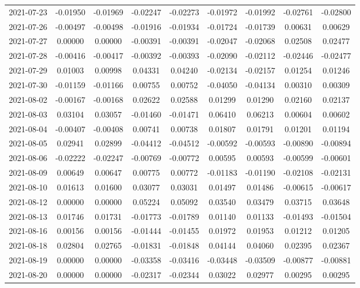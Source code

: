 \begin{footnotesize}
\begin{longtable}{lcccccccc}
2021-07-23 & -0.01950 & -0.01969 & -0.02247 & -0.02273 & -0.01972 & -0.01992 & -0.02761 & -0.02800 \\
2021-07-26 & -0.00497 & -0.00498 & -0.01916 & -0.01934 & -0.01724 & -0.01739 & 0.00631 & 0.00629 \\
2021-07-27 & 0.00000 & 0.00000 & -0.00391 & -0.00391 & -0.02047 & -0.02068 & 0.02508 & 0.02477 \\
2021-07-28 & -0.00416 & -0.00417 & -0.00392 & -0.00393 & -0.02090 & -0.02112 & -0.02446 & -0.02477 \\
2021-07-29 & 0.01003 & 0.00998 & 0.04331 & 0.04240 & -0.02134 & -0.02157 & 0.01254 & 0.01246 \\
2021-07-30 & -0.01159 & -0.01166 & 0.00755 & 0.00752 & -0.04050 & -0.04134 & 0.00310 & 0.00309 \\
2021-08-02 & -0.00167 & -0.00168 & 0.02622 & 0.02588 & 0.01299 & 0.01290 & 0.02160 & 0.02137 \\
2021-08-03 & 0.03104 & 0.03057 & -0.01460 & -0.01471 & 0.06410 & 0.06213 & 0.00604 & 0.00602 \\
2021-08-04 & -0.00407 & -0.00408 & 0.00741 & 0.00738 & 0.01807 & 0.01791 & 0.01201 & 0.01194 \\
2021-08-05 & 0.02941 & 0.02899 & -0.04412 & -0.04512 & -0.00592 & -0.00593 & -0.00890 & -0.00894 \\
2021-08-06 & -0.02222 & -0.02247 & -0.00769 & -0.00772 & 0.00595 & 0.00593 & -0.00599 & -0.00601 \\
2021-08-09 & 0.00649 & 0.00647 & 0.00775 & 0.00772 & -0.01183 & -0.01190 & -0.02108 & -0.02131 \\
2021-08-10 & 0.01613 & 0.01600 & 0.03077 & 0.03031 & 0.01497 & 0.01486 & -0.00615 & -0.00617 \\
2021-08-12 & 0.00000 & 0.00000 & 0.05224 & 0.05092 & 0.03540 & 0.03479 & 0.03715 & 0.03648 \\
2021-08-13 & 0.01746 & 0.01731 & -0.01773 & -0.01789 & 0.01140 & 0.01133 & -0.01493 & -0.01504 \\
2021-08-16 & 0.00156 & 0.00156 & -0.01444 & -0.01455 & 0.01972 & 0.01953 & 0.01212 & 0.01205 \\
2021-08-18 & 0.02804 & 0.02765 & -0.01831 & -0.01848 & 0.04144 & 0.04060 & 0.02395 & 0.02367 \\
2021-08-19 & 0.00000 & 0.00000 & -0.03358 & -0.03416 & -0.03448 & -0.03509 & -0.00877 & -0.00881 \\
2021-08-20 & 0.00000 & 0.00000 & -0.02317 & -0.02344 & 0.03022 & 0.02977 & 0.00295 & 0.00295 \\

\end{longtable}
\end{footnotesize}
